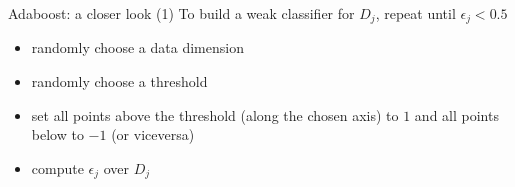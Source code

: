 \begin{frame}{Adaboost: a closer look (1)}
To build a weak classifier for $D_j$, repeat until $\epsilon_j<0.5$
\begin{itemize}
\item randomly choose a data dimension
\item randomly choose a threshold
\item set all points above the threshold (along the chosen axis) to $1$ and all points below to $-1$ (or viceversa)
\item compute $\epsilon_j$ over $D_j$
\end{itemize}
\end{frame}
